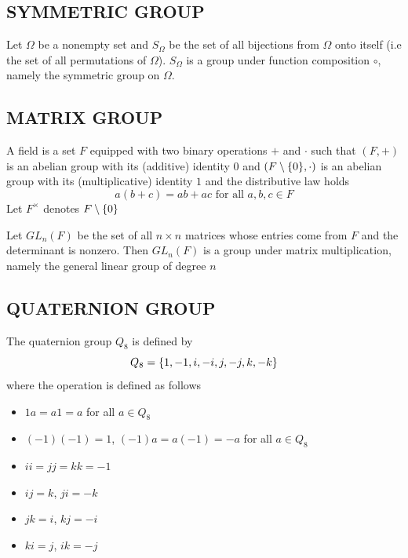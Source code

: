 \subsection{SYMMETRIC GROUP}

\begin{definition}
	Let $\Omega$ be a nonempty set and $S_\Omega$ be the set of all bijections from $\Omega$ onto itself (i.e the set of all permutations of $\Omega$). $S_\Omega$ is a group under function composition $\circ$, namely the symmetric group on $\Omega$.
\end{definition} 

\subsection{MATRIX GROUP}

\begin{definition}[Field]
	A field is a set $F$ equipped with two binary operations $+$ and $\cdot$ such that $(F, +)$ is an abelian group with its (additive) identity $0$ and $(F \setminus \{0\}, \cdot)$ is an abelian group with its (multiplicative) identity $1$ and the distributive law holds
	\[
	a(b+c) = ab + ac \text{ for all $a, b, c \in F$}
	\]
	Let $F^{\times}$ denotes $F \setminus \{0\}$
\end{definition}

\begin{definition}
	Let $GL_{n}(F)$ be the set of all $n \times n$ matrices whose entries come from $F$ and the determinant is nonzero. Then $GL_{n}(F)$ is a group under matrix multiplication, namely the general linear group of degree $n$
\end{definition}

\subsection{QUATERNION GROUP}

\begin{definition}
	The quaternion group $Q_8$ is defined by
	\[
	Q_8 = \{1, -1, i, -i, j, -j, k, -k\}
	\]
	where the operation is defined as follows
	\begin{itemize}
		\item $1a = a1 = a$ for all $a \in Q_8$
		\item $(-1)(-1) = 1$, $(-1)a = a(-1) = -a$ for all $a \in Q_8$
		\item $ii = jj = kk = -1$
		\item $ij = k$, $ji = -k$
		\item $jk = i$, $kj = -i$
		\item $ki = j$, $ik = -j$
	\end{itemize}
\end{definition}

